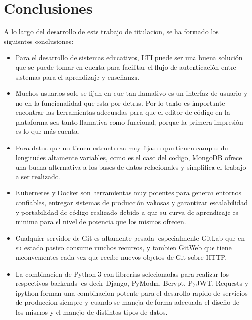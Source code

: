 
\chapter{Conclusiones}
\label{capitulo7}




A lo largo del desarrollo de este trabajo de titulacion, se ha formado los siguientes conclusiones:

\begin{itemize}
  \item Para el desarrollo de sistemas educativos, LTI puede ser una buena solución que se puede tomar en cuenta para facilitar el flujo de autenticación entre sistemas para el aprendizaje y enseñanza.
  \item Muchos usuarios solo se fijan en que tan llamativo es un interfaz de usuario y no en la funcionalidad que esta por detras. Por lo tanto es importante encontrar las herramientas adecuadas para que el editor de código en la plataforma sea tanto llamativa como funcional, porque la primera impresión es lo que más cuenta.
  \item Para datos que no tienen estructuras muy fijas o que tienen campos de longitudes altamente variables, como es el caso del codigo, MongoDB ofrece una buena alternativa a los bases de datos relacionales y simplifica el trabajo a ser realizado.
  \item Kubernetes y Docker son herramientas muy potentes para generar entornos confiables, entregar sistemas de producción valiosas y garantizar escalabilidad y portabilidad de código realizado debido a que su curva de aprendizaje es minima para el nivel de potencia que los mismos ofrecen.
  \item Cualquier servidor de Git es altamente pesada, especialmente GitLab que en su estado pasivo consume muchos recursos, y tambien GitWeb que tiene inconvenientes cada vez que recibe nuevos objetos de Git sobre HTTP.
  \item La combinacion de Python 3 con librerias selecionadas para realizar los respectivos backends, es decir Django, PyModm, Bcrypt, PyJWT, Requests y ipython forman una combinacion potente para el desarollo rapido de servicios de produccion siempre y cuando se maneja de forma adecuada el diseño de los mismos y el manejo de distintos tipos de datos.
\end{itemize}
